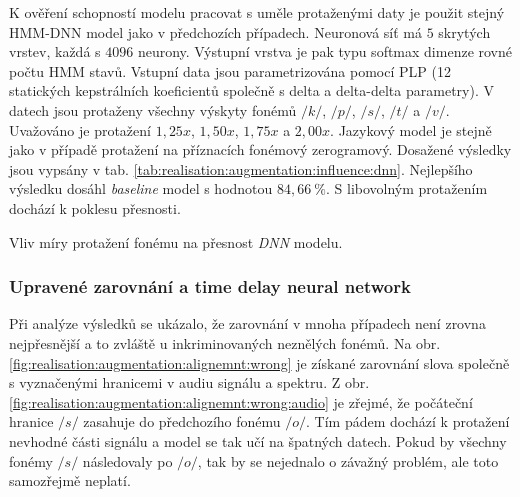 K ověření schopností modelu pracovat s uměle protaženými daty je použit stejný HMM-DNN model jako v předchozích případech. Neuronová síť má $5$ skrytých vrstev, každá s $4096$ neurony. Výstupní vrstva je pak typu softmax dimenze rovné počtu HMM stavů. Vstupní data jsou parametrizována pomocí PLP (12 statických kepstrálních koeficientů společně s delta a delta-delta parametry). V datech jsou protaženy všechny výskyty fonémů $/k/$, $/p/$, $/s/$, $/t/$ a $/v/$. Uvažováno je protažení $1,25x$, $1,50x$, $1,75x$ a $2,00x$. Jazykový model je stejně jako v případě protažení na příznacích fonémový zerogramový. Dosažené výsledky jsou vypsány v tab. \ref{tab:realisation:augmentation:influence:dnn}. Nejlepšího výsledku dosáhl \textit{baseline} model s hodnotou $84,66\ \%$. S libovolným protažením dochází k poklesu přesnosti.

\begin{table}[htpb]
  \centering
  \def\arraystretch{1.5}
  \caption{Vliv míry protažení fonému na přesnost \textit{DNN} modelu.}
  \label{tab:realisation:augmentation:influence:dnn}
\end{table}

\subsubsection{Upravené zarovnání a time delay neural network}

Při analýze výsledků se ukázalo, že zarovnání v mnoha případech není zrovna nejpřesnější a to zvláště u inkriminovaných neznělých fonémů. Na obr. \ref{fig:realisation:augmentation:alignemnt:wrong} je získané zarovnání slova  společně s vyznačenými hranicemi v audiu signálu a spektru. Z obr. \ref{fig:realisation:augmentation:alignemnt:wrong:audio} je zřejmé, že počáteční hranice $/s/$ zasahuje do předchozího fonému $/o/$. Tím pádem dochází k protažení nevhodné části signálu a model se tak učí na špatných datech. Pokud by všechny fonémy $/s/$ následovaly po $/o/$, tak by se nejednalo o závažný problém, ale toto samozřejmě neplatí.

